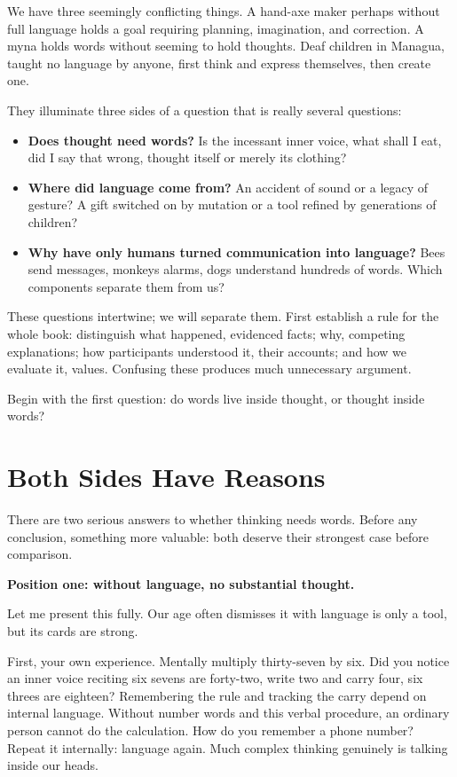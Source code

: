 We have three seemingly conflicting things. A hand-axe maker perhaps without full language holds a goal requiring planning, imagination, and correction. A myna holds words without seeming to hold thoughts. Deaf children in Managua, taught no language by anyone, first think and express themselves, then create one.

They illuminate three sides of a question that is really several questions:

\begin{itemize}
\item \textbf{Does thought need words?} Is the incessant inner voice, what shall I eat, did I say that wrong, thought itself or merely its clothing?
\item \textbf{Where did language come from?} An accident of sound or a legacy of gesture? A gift switched on by mutation or a tool refined by generations of children?
\item \textbf{Why have only humans turned communication into language?} Bees send messages, monkeys alarms, dogs understand hundreds of words. Which components separate them from us?
\end{itemize}
These questions intertwine; we will separate them. First establish a rule for the whole book: distinguish what happened, evidenced facts; why, competing explanations; how participants understood it, their accounts; and how we evaluate it, values. Confusing these produces much unnecessary argument.

Begin with the first question: do words live inside thought, or thought inside words?

\section{Both Sides Have Reasons}
There are two serious answers to whether thinking needs words. Before any conclusion, something more valuable: both deserve their strongest case before comparison.

\textbf{Position one: without language, no substantial thought.}

Let me present this fully. Our age often dismisses it with language is only a tool, but its cards are strong.

First, your own experience. Mentally multiply thirty-seven by six. Did you notice an inner voice reciting six sevens are forty-two, write two and carry four, six threes are eighteen? Remembering the rule and tracking the carry depend on internal language. Without number words and this verbal procedure, an ordinary person cannot do the calculation. How do you remember a phone number? Repeat it internally: language again. Much complex thinking genuinely is talking inside our heads.

